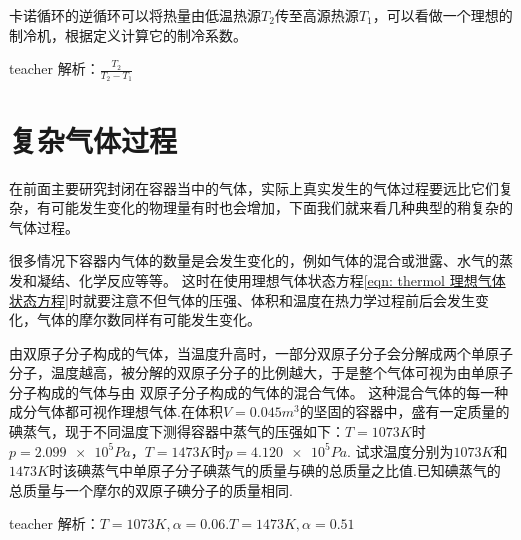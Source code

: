 \begin{example}
卡诺循环的逆循环可以将热量由低温热源$T_2$传至高源热源$T_1$，可以看做一个理想的制冷机，根据定义计算它的制冷系数。
\begin{taggedblock}{teacher}
\newline
解析：$\frac{T_2}{T_2-T_1}$
\end{taggedblock}
\end{example}


\section{复杂气体过程}
在前面主要研究封闭在容器当中的气体，实际上真实发生的气体过程要远比它们复杂，有可能发生变化的物理量有时也会增加，下面我们就来看几种典型的稍复杂的气体过程。


很多情况下容器内气体的数量是会发生变化的，例如气体的混合或泄露、水气的蒸发和凝结、化学反应等等。
这时在使用理想气体状态方程\ref{eqn: thermol 理想气体状态方程}时就要注意不但气体的压强、体积和温度在热力学过程前后会发生变化，气体的摩尔数同样有可能发生变化。


\begin{example}
	由双原子分子构成的气体，当温度升高时，一部分双原子分子会分解成两个单原子分子，温度越高，被分解的双原子分子的比例越大，于是整个气体可视为由单原子分子构成的气体与由	双原子分子构成的气体的混合气体。
	这种混合气体的每一种成分气体都可视作理想气体.在体积$	V=0.045m^3$的坚固的容器中，盛有一定质量的碘蒸气，现于不同温度下测得容器中蒸气的压强如下：$T=1073K$时$p = \num{2.099e5}\si{Pa}$，$T=1473K$时$p = \num{4.120e5}\si{Pa}$.
	试求温度分别为$ 1073K $和$ 1473K $时该碘蒸气中单原子分子碘蒸气的质量与碘的总质量之比值.已知碘蒸气的总质量与一个摩尔的双原子碘分子的质量相同.
	\begin{taggedblock}{teacher}
		\noindent
		解析：$T=1073K,\alpha=0.06.  T=1473K,\alpha=0.51$
	\end{taggedblock}
\end{example}




